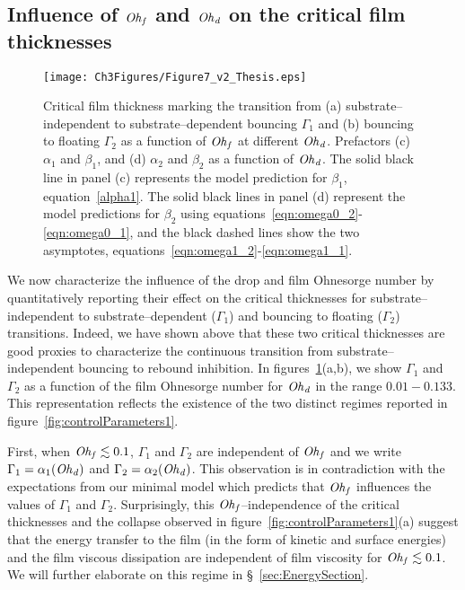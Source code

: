 \subsection{Influence of $\mathit{Oh}_\mathit{f}$ and $\mathit{Oh}_\mathit{d}$ on the critical film thicknesses}
\begin{figure}
	\centering
	\texttt{[image: Ch3Figures/Figure7\_v2\_Thesis.eps]}
	\caption{Critical film thickness marking the transition from (a)  substrate--independent to substrate--dependent bouncing $\Gamma_1$ and (b) bouncing to floating $\Gamma_2$ as a function of $\mathit{Oh}_\mathit{f}$ at different $\mathit{Oh}_\mathit{d}$. Prefactors (c) $\alpha_{1}$ and $\beta_{1}$, and (d) $\alpha_{2}$ and $\beta_{2}$ as a function of $\mathit{Oh}_\mathit{d}$. The solid black line in panel (c) represents the model prediction for $\beta_1$, equation~\eqref{alpha1}. The solid black lines in panel (d) represent the model predictions for $\beta_2$ using equations~\eqref{eqn:omega0_2}-\eqref{eqn:omega0_1}, and the black dashed lines show the two asymptotes, equations~\eqref{eqn:omega1_2}-\eqref{eqn:omega1_1}.}
	\label{fig:Gamma1Gamma2}
\end{figure}

We now characterize the influence of the drop and film Ohnesorge number by quantitatively reporting their effect on the critical thicknesses for substrate--independent to substrate--dependent ($\Gamma_1$) and bouncing to floating ($\Gamma_2$) transitions. Indeed, we have shown above that these two critical thicknesses are good proxies to characterize the continuous transition from substrate--independent bouncing to rebound inhibition. In figures~\ref{fig:Gamma1Gamma2}(a,b), we show $\Gamma_1$ and $\Gamma_2$ as a function of the film Ohnesorge number for $\mathit{Oh}_\mathit{d}$ in the range $0.01 - 0.133$. This representation reflects the existence of the two distinct regimes reported in figure~\ref{fig:controlParameters1}. 

First, when $\mathit{Oh}_\mathit{f} \lesssim 0.1$, $\Gamma_1$ and $\Gamma_2$ are independent of $\mathit{Oh}_\mathit{f}$ and we write $\Gamma_1 = \alpha_1(\mathit{Oh}_\mathit{d})$ and $\Gamma_2 = \alpha_2(\mathit{Oh}_\mathit{d})$. This observation is in contradiction with the expectations from our minimal model which predicts that $\mathit{Oh}_\mathit{f}$ influences the values of $\Gamma_1$ and $\Gamma_2$. Surprisingly, this $\mathit{Oh}_\mathit{f}$--independence of the critical thicknesses and the collapse observed in figure~\ref{fig:controlParameters1}(a) suggest that the energy transfer to the film (in the form of kinetic and surface energies) and the film viscous dissipation are independent of film viscosity for $\mathit{Oh}_\mathit{f} \lesssim 0.1$. We will further elaborate on this regime in \S~\ref{sec:EnergySection}. 

